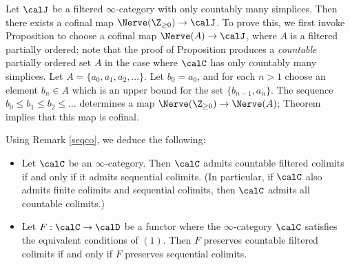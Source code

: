 \begin{remark}\label{seqco}
Let $\calJ$ be a filtered $\infty$-category with only countably many simplices.
Then there exists a cofinal map $\Nerve( \Z_{\geq 0} ) \rightarrow \calJ$.
To prove this, we first invoke Proposition  to choose a cofinal map
$\Nerve(A) \rightarrow \calJ$, where $A$ is a filtered partially ordered; note that
the proof of Proposition  produces a {\em countable} partially
ordered set $A$ in the case where $\calC$ has only countably many simplices.
Let $A = \{ a_0, a_1, a_2, \ldots \}$. Let $b_0 = a_0$, and for each $n > 1$
choose an element $b_n \in A$ which is an upper bound for the set
$\{ b_{n-1}, a_n \}$. The sequence $b_0 \leq b_1 \leq b_2 \leq \ldots$
determines a map $\Nerve( \Z_{\geq 0} ) \rightarrow \Nerve(A)$; Theorem  implies that this map is cofinal.
\end{remark}

\begin{remark}\label{swz}
Using Remark \ref{seqco}, we deduce the following:
\begin{itemize}
\item[$(1)$] Let $\calC$ be an $\infty$-category. Then $\calC$ admits countable filtered colimits
if and only if it admits sequential colimits. (In particular, if $\calC$ also admits finite colimits and
sequential colimits, then $\calC$ admits all countable colimits.)
\item[$(2)$] Let $F: \calC \rightarrow \calD$ be a functor where the $\infty$-category
$\calC$ satisfies the equivalent conditions of $(1)$. Then $F$ preserves countable filtered colimits 
if and only if $F$ preserves sequential colimits. 
\end{itemize}
\end{remark}

